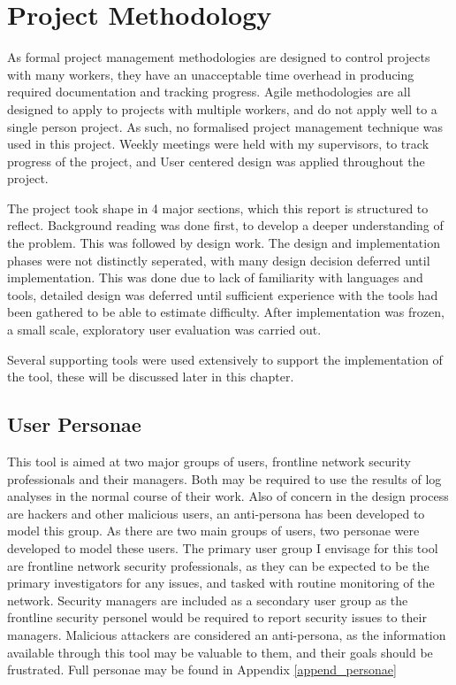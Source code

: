 \chapter{Project Methodology}\label{proj}

As formal project management methodologies are designed to control projects with many workers, they have an unacceptable time overhead in producing required documentation and tracking progress. Agile methodologies are all designed to apply to projects with multiple workers, and do not apply well to a single person project. As such, no formalised project management technique was used in this project.  
Weekly meetings were held with my supervisors, to track progress of the project, and User centered design was applied throughout the project. 

The project took shape in 4 major sections, which this report is structured to reflect. Background reading was done first, to develop a deeper understanding of the problem. This was followed by design work. The design and implementation phases were not distinctly seperated, with many design decision deferred until implementation. This was done due to lack of familiarity with languages and tools, detailed design was deferred until sufficient experience with the tools had been gathered to be able to estimate difficulty. After implementation was frozen, a small scale, exploratory user evaluation was carried out.

Several supporting tools were used extensively to support the implementation of the tool, these will be discussed later in this chapter. 

\section{User Personae}

This tool is aimed at two major groups of users, frontline network security professionals and their managers.
Both may be required to use the results of log analyses in the normal course of their work. Also of concern in the design process are hackers and other malicious users, an anti-persona has been developed to model this group. As there are two main groups of users, two personae were developed to model these users. 
The primary user group I envisage for this tool are frontline network security professionals, as they can be expected to be the primary investigators for any issues, and tasked with routine monitoring of the network.
Security managers are included as a secondary user group as the frontline security personel would be required to report security issues to their managers.
Malicious attackers are considered an anti-persona, as the information available through this tool may be valuable to them, and their goals should be frustrated.
Full personae may be found in Appendix \ref{append_personae}

